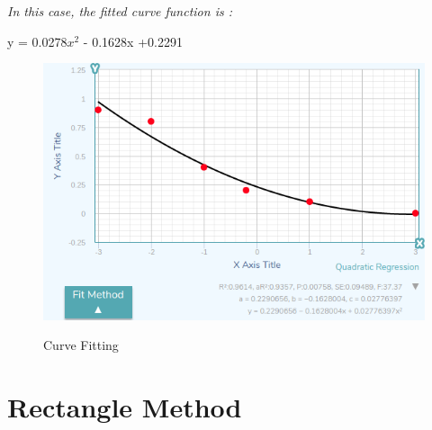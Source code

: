 \emph{\color{blue}In this case, the fitted curve function is :} \vfill 
\begin{center}
y = 0.0278$x^{2} $ - 0.1628x +0.2291
\end{center}

\begin{figure}[H]
 \centering
  \includegraphics[width=1\textwidth]{./Bilder/Curve_Fitting.png}\label{Curve_Fitting}
  \caption{Curve Fitting\cite{Curve_Fitting_Plot}}
\end{figure}


\section{Rectangle Method}\label{sec:Rectangle Method}


%




